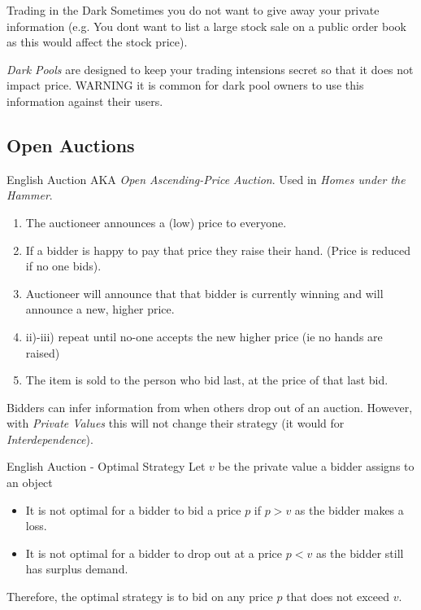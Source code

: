 \documentclass[11pt,a4paper]{article}
\begin{document}
\begin{proposition}{Trading in the Dark}
  Sometimes you do not want to give away your private information (e.g. You dont want to list a large stock sale on a public order book as this would affect the stock price).
  \par \textit{Dark Pools} are designed to keep your trading intensions secret so that it does not impact price. WARNING it is common for dark pool owners to use this information against their users.
\end{proposition}

\subsection{Open Auctions}

\begin{definition}{English Auction}
  AKA \textit{Open Ascending-Price Auction}. Used in \textit{Homes under the Hammer}.
  \begin{enumerate}
    \item The auctioneer announces a (low) price to everyone.
    \item If a bidder is happy to pay that price they raise their hand. (Price is reduced if no one bids).
    \item Auctioneer will announce that that bidder is currently winning and will announce a new, higher price.
    \item ii)-iii) repeat until no-one accepts the new higher price (ie no hands are raised)
    \item The item is sold to the person who bid last, at the price of that last bid.
  \end{enumerate}
  Bidders can infer information from when others drop out of an auction. However, with \textit{Private Values} this will not change their strategy (it would for \textit{Interdependence}).
\end{definition}

\begin{proposition}{English Auction - Optimal Strategy}
  Let $v$ be the private value a bidder assigns to an object
  \begin{itemize}
    \item It is not optimal for a bidder to bid a price $p$ if $p>v$ as the bidder makes a loss.
    \item It is not optimal for a bidder to drop out at a price $p<v$ as the bidder still has surplus demand.
  \end{itemize}
  Therefore, the optimal strategy is to bid on any price $p$ that does not exceed $v$.
\end{proposition}
\end{document}
